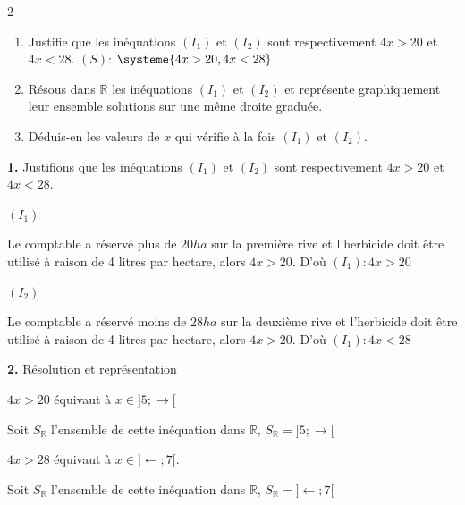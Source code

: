 \begin{multicols*}{2}
  	
  	\begin{enumerate}
  		\item Justifie que les inéquations $(I_{1})$ et $(I_{2})$ sont respectivement $4x>20$ et $4x<28$.
  		 $(S)$: $\systeme{4x > 20,4x < 28}$
  		
  		\item Résous dans $\mathbb{R}$ les inéquations $(I_{1})$ et $(I_{2})$  et représente graphiquement leur ensemble solutions sur une même droite graduée.
  		\item Déduis-en les valeurs de $x$ qui vérifie à la fois $(I_{1})$ et $(I_{2})$.
  		
  	\end{enumerate}
  	
  	\dure
  	\resul
  	\textbf{1.} Justifions que les inéquations $(I_{1})$ et $(I_{2})$ sont respectivement $4x>20$ et $4x<28$.
  	
  	 $(I_{1})$
  	
  	Le comptable a réservé plus de $20 ha$ sur la première rive et l'herbicide doit être utilisé à raison de 4 litres par hectare, alors $4x>20$. D'où $(I_{1}): 4x>20$
  	
  	 $(I_{2})$
  	
  	Le comptable a réservé moins de $28 ha$ sur la deuxième rive et l'herbicide doit être utilisé à raison de 4 litres par hectare, alors $4x>20$. D'où $(I_{1}): 4x<28$
  	
  	\textbf{2.} Résolution et représentation
  	
  	$4x>20$ équivaut à $x\in ]5;\rightarrow [$ 
  	
  	Soit $S_{\mathbb{R}}$ l'ensemble de cette inéquation dans $\mathbb{R}$, $S_{\mathbb{R}}=]5;\rightarrow [$
  	
  	$4x>28$ équivaut à $x\in ]\leftarrow; 7 [$.
  	
  	Soit $S_{\mathbb{R}}$ l'ensemble de cette inéquation dans $\mathbb{R}$, $S_{\mathbb{R}}=]\leftarrow; 7 [$
  	

\end{multicols*}
